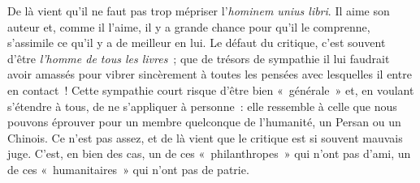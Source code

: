 \documentclass[french,twoside]{book} %
\begin{document}
De là vient qu’il ne faut pas trop mépriser l’\emph{hominem unius libri}. Il aime son auteur et, comme il l’aime, il y a grande chance pour qu’il le comprenne, s’assimile ce qu’il y a de meilleur en lui. Le défaut du critique, c’est souvent d’être \emph{l’homme de tous les livres} ; que de trésors de sympathie il lui faudrait avoir amassés pour vibrer sincèrement à toutes les pensées avec lesquelles il entre en contact ! Cette sympathie court risque d’être bien « générale » et, en voulant s’étendre à tous, de ne s’appliquer à personne : elle ressemble à celle que nous pouvons éprouver pour un membre quelconque de l’humanité, un Persan ou un Chinois. Ce n’est pas assez, et de là vient que le critique est si souvent mauvais juge. C’est, en bien des cas, un de ces « philanthropes » qui n’ont pas d’ami, un de ces « humanitaires » qui n’ont pas de patrie.\par
\end{document}
